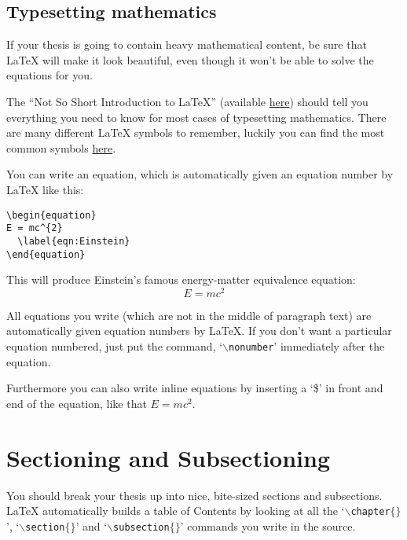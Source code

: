 \subsection{Typesetting mathematics}

If your thesis is going to contain heavy mathematical content, be sure that \LaTeX{} will make it look beautiful, even though it won't be able to solve the equations for you.

The ``Not So Short Introduction to \LaTeX{}'' (available \href{http://www.ctan.org/tex-archive/info/lshort/english/lshort.pdf}{here}) should tell you everything you need to know for most cases of typesetting mathematics. There are many different \LaTeX{} symbols to remember, luckily you can find the most common symbols \href{https://www.sharelatex.com/learn/List_of_Greek_letters_and_math_symbols}{here}.

You can write an equation, which is automatically given an equation number by \LaTeX{} like this:

\begin{verbatim}
\begin{equation}
E = mc^{2}
  \label{eqn:Einstein}
\end{equation}
\end{verbatim}

This will produce Einstein's famous energy-matter equivalence equation:
\begin{equation}
E = mc^{2}
\label{eqn:Einstein}
\end{equation}

All equations you write (which are not in the middle of paragraph text) are automatically given equation numbers by \LaTeX{}. If you don't want a particular equation numbered, just put the command, `$\backslash$\texttt{nonumber}' immediately after the equation.

Furthermore you can also write inline equations by inserting a `\$' in front and end of the equation, like that $E=mc^2$.


\section{Sectioning and Subsectioning}

You should break your thesis up into nice, bite-sized sections and subsections. \LaTeX{} automatically builds a table of Contents by looking at all the `$\backslash$\texttt{chapter}$\{\}$', `$\backslash$\texttt{section}$\{\}$' and `$\backslash$\texttt{subsection}$\{\}$' commands you write in the source.


